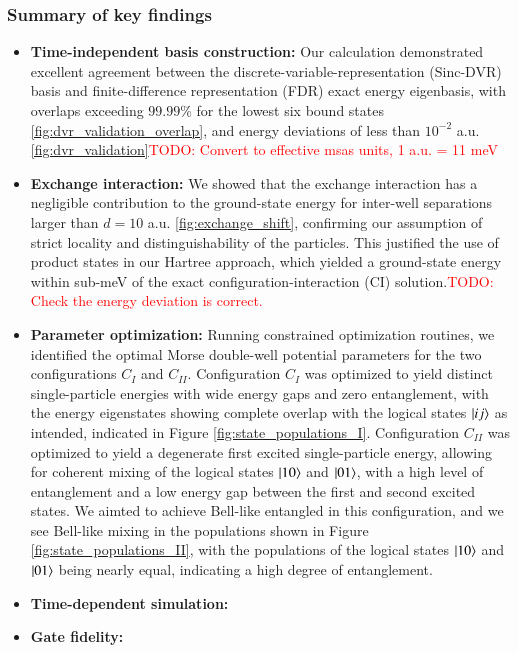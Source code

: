 \documentclass{subfiles}
\begin{document}
\subsubsection*{Summary of key findings}
\begin{itemize}
    \item \textbf{Time-independent basis construction:} Our calculation demonstrated excellent agreement between the discrete-variable-representation (Sinc-DVR) basis and finite-difference representation (FDR) exact energy eigenbasis, with overlaps exceeding $99.99\%$ for the lowest six bound states \ref{fig:dvr_validation_overlap}, and energy deviations of less than $10^{-2}$ a.u. \ref{fig:dvr_validation}\textcolor{red}{TODO: Convert to effective msas units, 1 a.u. = 11 meV}
    \item \textbf{Exchange interaction:} We showed that the exchange interaction has a negligible contribution to the ground-state energy for inter-well separations larger than $d = 10$ a.u. \ref{fig:exchange_shift}, confirming our assumption of strict locality and distinguishability of the particles. This justified the use of product states in our Hartree approach, which yielded a ground-state energy within sub-meV of the exact configuration-interaction (CI) solution.\textcolor{red}{TODO: Check the energy deviation is correct.}
    \item \textbf{Parameter optimization:} Running constrained optimization routines, we identified the optimal Morse double-well potential parameters for the two configurations $C_I$ and $C_{II}$. Configuration $C_I$ was optimized to yield distinct single-particle energies with wide energy gaps and zero entanglement, with the energy eigenstates showing complete overlap with the logical states $\ket{ij}$ as intended, indicated in Figure \ref{fig:state_populations_I}. Configuration $C_{II}$ was optimized to yield a degenerate first excited single-particle energy, allowing for coherent mixing of the logical states $\ket{10}$ and $\ket{01}$, with a high level of entanglement and a low energy gap between the first and second excited states. We aimted to achieve Bell-like entangled in this configuration, and we see Bell-like mixing in the populations shown in Figure \ref{fig:state_populations_II}, with the populations of the logical states $\ket{10}$ and $\ket{01}$ being nearly equal, indicating a high degree of entanglement.
    \item \textbf{Time-dependent simulation:} 
    \item \textbf{Gate fidelity:}
\end{itemize}
\end{document}
